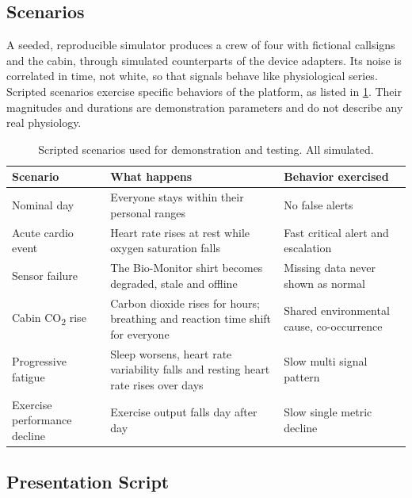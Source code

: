 \subsection{Scenarios}
\label{subsec:scenarios}

A seeded, reproducible simulator produces a crew of four with fictional callsigns and the cabin, through simulated counterparts of the device adapters. Its noise is correlated in time, not white, so that signals behave like physiological series. Scripted scenarios exercise specific behaviors of the platform, as listed in \ref{tab:scenarios}. Their magnitudes and durations are demonstration parameters and do not describe any real physiology.

\begin{table}[htbp]
\centering
\vspace{0.8em}
\caption{Scripted scenarios used for demonstration and testing. All simulated.}
\label{tab:scenarios}
\small
\begin{tabular}{p{3.4cm}p{6.4cm}p{4.2cm}}
\hline
\textbf{Scenario} & \textbf{What happens} & \textbf{Behavior exercised} \\
\hline
Nominal day & Everyone stays within their personal ranges & No false alerts \\
Acute cardio event & Heart rate rises at rest while oxygen saturation falls & Fast critical alert and escalation \\
Sensor failure & The Bio-Monitor shirt becomes degraded, stale and offline & Missing data never shown as normal \\
Cabin CO\textsubscript{2} rise & Carbon dioxide rises for hours; breathing and reaction time shift for everyone & Shared environmental cause, co-occurrence \\
Progressive fatigue & Sleep worsens, heart rate variability falls and resting heart rate rises over days & Slow multi signal pattern \\
Exercise performance decline & Exercise output falls day after day & Slow single metric decline \\
\hline
\end{tabular}
\vspace{1.2em}
\end{table}

\subsection{Presentation Script}
\label{subsec:presentation-script}

